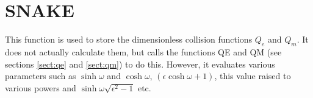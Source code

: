 \section{SNAKE}
\label{sect:snake}

\noindent This function is used to store the dimensionless collision
functions $Q_e$ and $Q_m$. It does not actually calculate them, but
calls the functions QE and QM (see sections \ref{sect:qe} and
\ref{sect:qm}) to do this. However, it evaluates various parameters
such as $\sinh\omega$ and $\cosh\omega$, $(\epsilon \cosh\omega + 1)$,
this value raised to various powers and $\sinh\omega \sqrt{\epsilon^2 -
1}$ etc.\\

